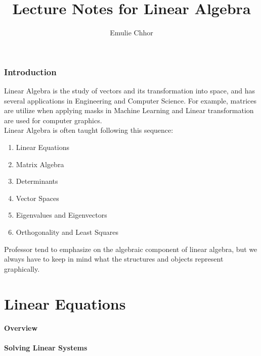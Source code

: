 \documentclass{article}
\begin{document}
\title{Lecture Notes for Linear Algebra}
\author{Emulie Chhor}
\maketitle

\section{Introduction}

Linear Algebra is the study of vectors and its transformation into space, and has
several applications in Engineering and Computer Science. For example, matrices
are utilize when applying masks in Machine Learning and Linear transformation are
used for computer graphics.\\

Linear Algebra is often taught following this sequence:

    \begin{enumerate}
	\item Linear Equations
	\item Matrix Algebra
	\item Determinants
	\item Vector Spaces
	\item Eigenvalues and Eigenvectors
	\item Orthogonality and Least Squares
    \end{enumerate}

Professor tend to emphasize on the algebraic component of linear algebra, but we
always have to keep in mind what the structures and objects represent graphically.

\newtheorem{definition}{Definition}[subsection]
\newtheorem{theorem}{Theorem}[subsection]
\newtheorem{corollary}{Corollary}[subsection]
\newtheorem{lemma}[theorem]{Lemma}
\newtheorem*{remark}{Remark}

\part{Linear Equations}

\subsection{Overview}

\subsection{Solving Linear Systems}
\end{document}
